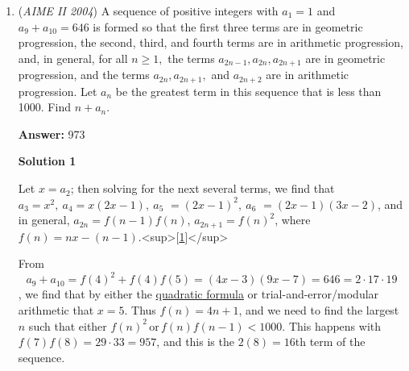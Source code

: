 \begin{enumerate}
 \[2004^{2004}\]
 \[= (2^2 \cdot 3 \cdot 167)^{2004}\]
 \[= 2^{4008} \cdot 3^{2004} \cdot 167^{2004}\]
 \[2^{i}3^{j}167^{k} \ | \ 2004^{2004}\]
 \[0 \le i \le 4008, 0 \le j \le 2004, 0 \le k \le 2004\]
 \[i,j,k \not \ge 2004 \ \text{otherwise} \ (i+1) > 2004\]
 \[0 \le i, j, k < 2004\]
 \[(i+1)(j+1)(k+1) = 2004\]

 Each of these must contain values that multiply to $2^2, 3^1, 167^1$. Consider the exponents of each of the values $i+1, j+1, k+1$. Then, we see that if each of $i+1 = a, j+1 = b, k+1 = c$ exists as a prime factorization $a,b,c = 2^{x_1,x_4,x_7}3^{x_2,x_5,x_8}167^{x_3,x_6,x_9}$. Therefore, we see that the solutions for $a$ exist as $x_1 + x_4 + x_7 = 2$, for $b$, $x_2 + x_5 + x_8 = 1$, and for $c$, $x_3 + x_6 + x_9 = 1$. Through stars and bars, we have $a$ has 6 choices, $b$ has 3, and so does $c$. Then, $abc$ has $6 \cdot 3 \cdot 3 = \boxed{054}$ total cases.

 


	\item (\textit{AIME II 2004}) A sequence of positive integers with $a_1=1$ and $a_9+a_{10}=646$ is formed so that the first three terms are in geometric progression, the second, third, and fourth terms are in arithmetic progression, and, in general, for all $n\ge1,$ the terms $a_{2n-1}, a_{2n}, a_{2n+1}$ are in geometric progression, and the terms $a_{2n}, a_{2n+1},$ and $a_{2n+2}$ are in arithmetic progression. Let $a_n$ be the greatest term in this sequence that is less than 1000. Find $n+a_n.$

 \textbf{Answer: }973



\textbf{Solution 1}

Let $x = a_2$; then solving for the next several terms, we find that $a_3 = x^2,\ a_4 = x(2x-1),\ a_5$ $= (2x-1)^2,\ a_6$ $= (2x-1)(3x-2)$, and in general, $a_{2n} = f(n-1)f(n)$, $a_{2n+1} = f(n)^2$, where $f(n) = nx - (n-1)$.<sup>[\href{https://artofproblemsolving.com\#note\_1}{1}]</sup> 

 From 
 \[a_9 + a_{10} = f(4)^2 + f(4)f(5) = (4x-3)(9x-7) = 646 = 2\cdot 17 \cdot 19\], we find that by either the \href{https://artofproblemsolving.com/wiki/index.php?title=Quadratic\_formula}{quadratic formula} or trial-and-error/modular arithmetic that $x=5$. Thus $f(n) = 4n+1$, and we need to find the largest $n$ such that either $f(n)^2\, \mathrm{or}\, f(n)f(n-1) < 1000$. This happens with $f(7)f(8) = 29 \cdot 33 = 957$, and this is the $2(8) = 16$th term of the sequence.


\end{enumerate}
